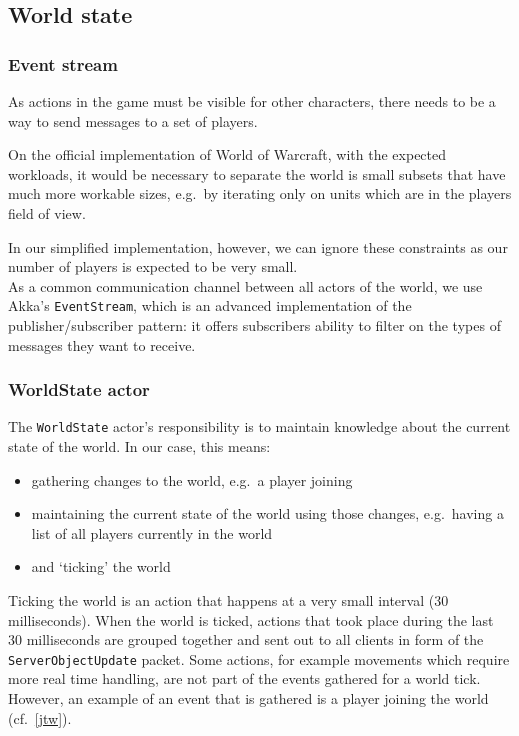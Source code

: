 \documentclass[paper=a4, fontsize=11pt]{scrartcl}
\begin{document}
\subsection{World state}

\subsubsection{Event stream}

As actions in the game must be visible for other characters, there needs to
be a way to send messages to a set of players.

On the official implementation of World of Warcraft, with the expected
workloads, it would be necessary to separate the world is small subsets that have
much more workable sizes, e.g.\ by iterating only on units which are in the
players field of view.

In our simplified implementation, however, we can ignore these constraints as
our number of players is expected to be very small.\\

As a common communication channel between all actors of the world, we use Akka's
\texttt{EventStream}, which is an advanced implementation of the
publisher/subscriber pattern: it offers subscribers ability to filter on the
types of messages they want to receive.

\subsubsection{WorldState actor}

The \texttt{WorldState} actor's responsibility is to maintain knowledge about
the current state of the world.
In our case, this means:
\begin{itemize}
    \item gathering changes to the world, e.g.\ a player joining
    \item maintaining the current state of the world using those changes, e.g.\
        having a list of all players currently in the world
    \item and `ticking' the world
\end{itemize}

Ticking the world is an action that happens at a very small interval (30
milliseconds).
When the world is ticked, actions that took place during the last 30
milliseconds are grouped together and sent out to all clients in form of the
\texttt{ServerObjectUpdate} packet.
Some actions, for example movements which require more real time handling,
are not part of the events gathered for a world tick. However, an example of an
event that is gathered is a player joining the world (cf.~\ref{jtw}).
\end{document}

